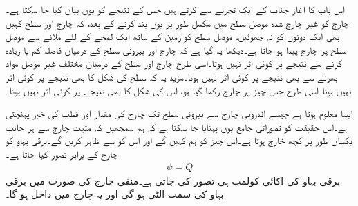 
اس باب کا آغاز جناب  کے ایک تجربے سے کرتے ہیں جس کے نتیجے کو یوں بیان کیا جا سکتا ہے۔چارج  کو غیر چارج شدہ موصل سطح میں مکمل طور پر یوں بند کرنے کے بعد، کہ چارج اور سطح  کہیں بھی ایک دونوں کو نہ چھوئیں، موصل سطح کو زمین کے ساتھ ایک لمحے کے لئے ملانے سے موصل سطح پر  چارج پیدا ہو جاتا ہے۔دیکھا یہ گیا ہے کہ چارج اور بیرونی سطح کے درمیان فاصلہ کم یا زیادہ کرنے سے نتیجے پر کوئی اثر نہیں ہوتا۔اسی طرح چارج اور سطح کے درمیان مختلف غیر موصل مواد بھرنے سے بھی نتیجے پر کوئی اثر نہیں ہوتا۔مزید یہ کہ سطح کی شکل کا بھی نتیجے پر کوئی اثر نہیں ہوتا۔اسی طرح جس چیز پر چارج  رکھا گیا ہو، اس کی شکل کا بھی نتیجے پر کوئی اثر نہیں ہوتا۔ 

ایسا معلوم ہوتا ہے جیسے اندرونی چارج سے بیرونی سطح تک چارج کی مقدار اور قطب کی خبر پہنچتی ہے۔اس حقیقت کو تصوراتی جامع یوں پہنایا جا سکتا ہے کہ ہم سمجھیں کہ مثبت چارج سے ہر جانب یکساں طور پر کچھ خارج ہوتا ہے۔اس چیز کو ہم   کہیں گے اور اس کو  سے ظاہر کریں گے۔برقی بہاو کو چارج کے برابر تصور کیا جاتا ہے۔
\begin{align}
\psi=Q
\end{align}
برقی بہاو کی اکائی  کولمب  ہی تصور کی جاتی ہے۔منفی چارج کی صورت میں برقی بہاو کی سمت الٹی ہو گی اور یہ چارج میں داخل ہو گا۔

